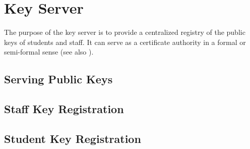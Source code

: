 
\section{Key Server}

The purpose of the key server is to provide a centralized registry of the
public keys of students and staff. It can serve as a certificate authority in a
formal or semi-formal sense (see also
).

\subsection{Serving Public Keys}

\subsection{Staff Key Registration}

\subsection{Student Key Registration}
